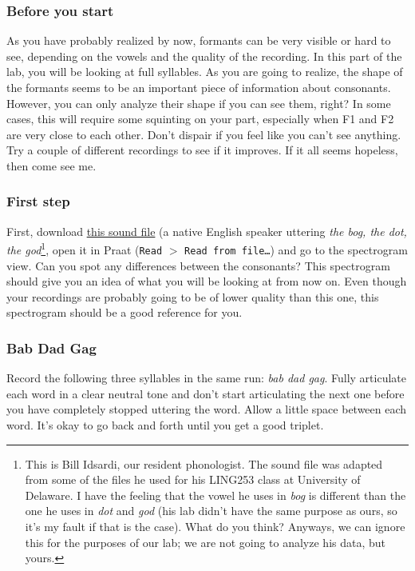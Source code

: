 \documentclass{article}
\newcommand{\soft}[1]{\textsf{#1}}
\newcommand{\softmenu}[1]{\texttt{#1}}
\newcommand{\Praat}{\soft{Praat}}
\begin{document}
\subsubsection{Before you start}

As you have probably realized by now, formants can be very visible or hard to see, depending on the vowels and the quality of the recording. In this part of the lab, you will be looking at full syllables. As you are going to realize, the shape of the formants seems to be an important piece of information about consonants. However, you can only analyze their shape if you can see them, right? In some cases, this will require some squinting on your part, especially when F1 and F2 are very close to each other. Don't dispair if you feel like you can't see anything. Try a couple of different recordings to see if it improves. If it all seems hopeless, then come see me.

\subsubsection{First step}

First, download \href{http://www.ling.umd.edu/~diogo/courses/ling499a/thebog-thedot-thegod.wav}{this sound file} (a native English speaker uttering \emph{the bog, the dot, the god}\footnote{This is Bill Idsardi, our resident phonologist. The sound file was adapted from some of the files he used for his LING253 class at University of Delaware. I have the feeling that the vowel he uses in \emph{bog} is different than the one he uses in \emph{dot} and \emph{god} (his lab didn't have the same purpose as ours, so it's my fault if that is the case). What do you think? Anyways, we can ignore this for the purposes of our lab; we are not going to analyze his data, but yours.}, open it in \Praat{} (\softmenu{Read} $>$ \softmenu{Read from file\ldots}) and go to the spectrogram view. Can you spot any differences between the consonants? This spectrogram should give you an idea of what you will be looking at from now on. Even though your recordings are probably going to be of lower quality than this one, this spectrogram should be a good reference for you.

\subsubsection{Bab Dad Gag}

Record the following three syllables in the same run: \emph{bab dad gag}. Fully articulate each word in a clear neutral tone and don't start articulating the next one before you have completely stopped uttering the word. Allow a little space between each word. It's okay to go back and forth until you get a good triplet.
\end{document}

